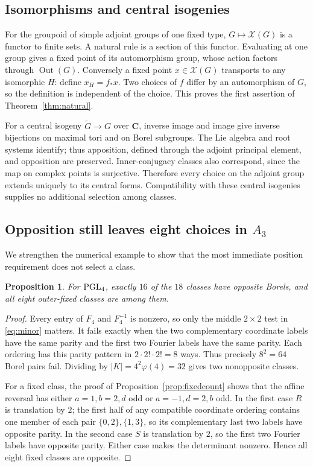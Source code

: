 \documentclass[11pt]{article}
\newcommand{\C}{\mathbf C}\newcommand{\Z}{\mathbf Z}\newcommand{\Q}{\mathbf Q}
\newcommand{\Out}{\operatorname{Out}}\newcommand{\Inn}{\operatorname{Inn}}
\newtheorem{proposition}[theorem]{Proposition}
\theoremstyle{definition}\newtheorem{definition}[theorem]{Definition}
\theoremstyle{remark}\newtheorem{remark}[theorem]{Remark}
\begin{document}
\subsection{Isomorphisms and central isogenies}
For the groupoid of simple adjoint groups of one fixed type, $G\mapsto\mathcal X(G)$ is a functor to finite sets. A natural rule is a section of this functor. Evaluating at one group gives a fixed point of its automorphism group, whose action factors through $\Out(G)$. Conversely a fixed point $x\in\mathcal X(G)$ transports to any isomorphic $H$: define $x_H=f_*x$. Two choices of $f$ differ by an automorphism of $G$, so the definition is independent of the choice. This proves the first assertion of Theorem~\ref{thm:natural}.

For a central isogeny $\widetilde G\to G$ over $\C$, inverse image and image give inverse bijections on maximal tori and on Borel subgroups. The Lie algebra and root systems identify; thus apposition, defined through the adjoint principal element, and opposition are preserved. Inner-conjugacy classes also correspond, since the map on complex points is surjective. Therefore every choice on the adjoint group extends uniquely to its central forms. Compatibility with these central isogenies supplies no additional selection among classes.

\subsection{Opposition still leaves eight choices in \texorpdfstring{$A_3$}{A3}}
We strengthen the numerical example to show that the most immediate position requirement does not select a class.
\begin{proposition}\label{prop:A3}
For $\operatorname{PGL}_4$, exactly $16$ of the $18$ classes have opposite Borels, and all eight outer-fixed classes are among them.
\end{proposition}
\begin{proof}
Every entry of $F_4$ and $F_4^{-1}$ is nonzero, so only the middle $2\times2$ test in \eqref{eq:minor} matters. It fails exactly when the two complementary coordinate labels have the same parity and the first two Fourier labels have the same parity. Each ordering has this parity pattern in $2\cdot2!\cdot2!=8$ ways. Thus precisely $8^2=64$ Borel pairs fail. Dividing by $|K|=4^2\varphi(4)=32$ gives two nonopposite classes.

For a fixed class, the proof of Proposition~\ref{prop:fixedcount} shows that the affine reversal has either $a=1,b=2,d$ odd or $a=-1,d=2,b$ odd. In the first case $R$ is translation by $2$; the first half of any compatible coordinate ordering contains one member of each pair $\{0,2\},\{1,3\}$, so its complementary last two labels have opposite parity. In the second case $S$ is translation by $2$, so the first two Fourier labels have opposite parity. Either case makes the determinant nonzero. Hence all eight fixed classes are opposite.
\end{proof}
\end{document}

